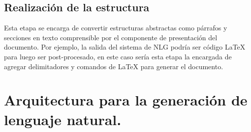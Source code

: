 
\subsection{Realización de la estructura}
Esta etapa se encarga de convertir estructuras abstractas como párrafos y secciones en texto comprensible por el componente de presentación del documento. Por ejemplo, la salida del sistema de NLG podría ser código LaTeX para luego ser post-procesado, en este caso sería esta etapa la encargada de agregar delimitadores y comandos de LaTeX para generar el documento. 


\section{Arquitectura para la generación de lenguaje natural.}